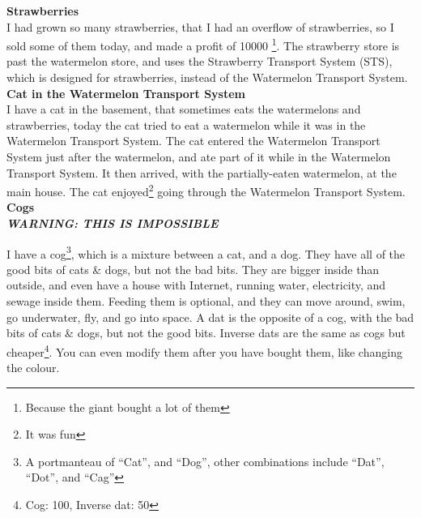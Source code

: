 \documentclass[UTF8]{tufte-book}
\newcommand{\warning}[1]{\textbf{\textit{WARNING: #1}}}
\newcommand{\WTS}{Watermelon Transport System\texttrademark}
\newcommand{\sts}{STS\texttrademark}
\newcommand{\STS}{Strawberry Transport System\texttrademark}
\newenvironment{entry}[2] %
{\noindent\textbf{#2}\marginnote{#1}\\}{\vspace{0.5cm}}
\begin{document}
\begin{entry}{2020-07-09}{Strawberries}
  I had grown so many strawberries, that I had an overflow of strawberries, so I sold some of them today,
  and made a profit of \texteuro{}10000 \footnote{Because the giant bought a lot of them}.
  The strawberry store is past the watermelon store, and uses the \STS{} (\sts),
  which is designed for strawberries, instead of the \WTS.\newline
\end{entry}
\begin{entry}{2020-07-10}{Cat in the \WTS}
  I have a cat in the basement, that sometimes eats the watermelons and strawberries,
  today the cat tried to eat a watermelon while it was in the \WTS.
  The cat entered the \WTS{} just after the watermelon, and ate part of it while in the \WTS.
  It then arrived, with the partially-eaten watermelon, at the main house.
  The cat enjoyed\footnote{It was fun} going through the \WTS.\newline
\end{entry}
\begin{entry}{2020-07-11}{Cogs}
  \warning{THIS IS IMPOSSIBLE}
  
  I have a cog\footnote{A portmanteau of ``Cat'', and ``Dog'', other combinations include ``Dat'', ``Dot'', and ``Cag''},
  which is a mixture between a cat, and a dog.
  They have all of the good bits of cats \& dogs, but not the bad bits.
  They are bigger inside than outside, and even have a house with Internet, running water, electricity, and sewage inside them.
  Feeding them is optional, and they can move around, swim, go underwater, fly, and go into space.
  A dat is the opposite of a cog, with the bad bits of cats \& dogs, but not the good bits.
  Inverse dats are the same as cogs but cheaper\footnote{Cog: \texteuro{}100, Inverse dat: \texteuro{}50}.
  You can even modify them after you have bought them, like changing the colour.\newline
\end{entry}
\end{document}
